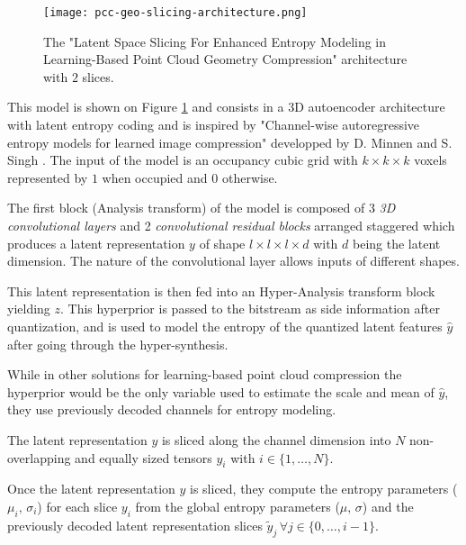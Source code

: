\begin{figure}
    \centering
    \texttt{[image: pcc-geo-slicing-architecture.png]}
    \caption{The "Latent Space Slicing For Enhanced Entropy Modeling in Learning-Based Point Cloud Geometry Compression" architecture with $2$ slices.}
    \label{fig:pcc-geo-slicing-architecture}
\end{figure}

This model is shown on Figure \ref{fig:pcc-geo-slicing-architecture} and consists in a 3D autoencoder architecture with latent entropy coding and is inspired by "Channel-wise autoregressive entropy models for learned image compression" developped by D. Minnen and S. Singh \cite{bib:2d-pcc-slicing}. 
The input of the model is an occupancy cubic grid with $k \times k \times k$ voxels represented by $1$ when occupied and $0$ otherwise. 


The first block (Analysis transform) of the model is composed of 3 \textit{3D convolutional layers} and 2 \textit{convolutional residual blocks} arranged staggered which produces a latent representation $y$ of shape $l \times l \times l \times d$ with $d$ being the latent dimension. The nature of the convolutional layer allows inputs of different shapes. 

This latent representation is then fed into an Hyper-Analysis transform block yielding $z$. This hyperprior is passed to the bitstream as side information after quantization, and is used to model the entropy of the quantized latent features $\hat{y}$ after going through the hyper-synthesis. 

While in other solutions for learning-based point cloud compression the hyperprior would be the only variable used to estimate the scale and mean of $\hat{y}$, they use previously decoded channels for entropy modeling.

The latent representation $y$ is sliced along the channel dimension into $N$ non-overlapping and equally sized tensors $y_i$ with $i \in \{1, \dots, N\}$. 

Once the latent representation $y$ is sliced, they compute the entropy parameters ($\mu_i,\,\sigma_i$) for each slice $y_i$ from the global entropy parameters ($\mu,\,\sigma$) and the previously decoded latent representation slices $\tilde{y}_j\,\forall j \in \{0,\dots,i-1\}$. 

